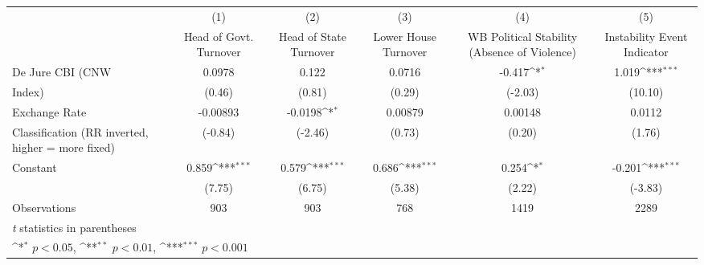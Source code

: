 {
\def\sym#1{\ifmmode^{#1}\else\(^{#1}\)\fi}
\begin{tabular}{l*{5}{c}}
\toprule
                &\multicolumn{1}{c}{(1)}&\multicolumn{1}{c}{(2)}&\multicolumn{1}{c}{(3)}&\multicolumn{1}{c}{(4)}&\multicolumn{1}{c}{(5)}\\
                &\multicolumn{1}{c}{Head of Govt. Turnover}&\multicolumn{1}{c}{Head of State Turnover}&\multicolumn{1}{c}{Lower House Turnover}&\multicolumn{1}{c}{WB Political Stability (Absence of Violence)}&\multicolumn{1}{c}{Instability Event Indicator}\\
\midrule
De Jure CBI (CNW&   0.0978         &    0.122         &   0.0716         &   -0.417\sym{*}  &    1.019\sym{***}\\
Index)          &   (0.46)         &   (0.81)         &   (0.29)         &  (-2.03)         &  (10.10)         \\
\addlinespace
Exchange Rate   & -0.00893         &  -0.0198\sym{*}  &  0.00879         &  0.00148         &   0.0112         \\
Classification (RR inverted, higher = more fixed)&  (-0.84)         &  (-2.46)         &   (0.73)         &   (0.20)         &   (1.76)         \\
\addlinespace
Constant        &    0.859\sym{***}&    0.579\sym{***}&    0.686\sym{***}&    0.254\sym{*}  &   -0.201\sym{***}\\
                &   (7.75)         &   (6.75)         &   (5.38)         &   (2.22)         &  (-3.83)         \\
\midrule
Observations    &      903         &      903         &      768         &     1419         &     2289         \\
\bottomrule
\multicolumn{6}{l}{\footnotesize \textit{t} statistics in parentheses}\\
\multicolumn{6}{l}{\footnotesize \sym{*} \(p<0.05\), \sym{**} \(p<0.01\), \sym{***} \(p<0.001\)}\\
\end{tabular}
}
